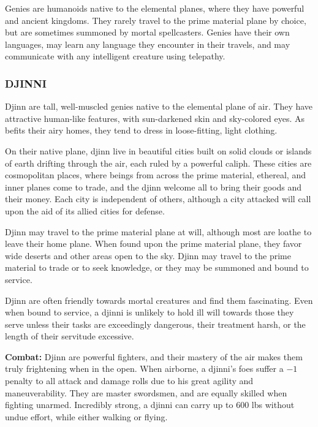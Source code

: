 \begin{multicols}{2}
\begin{minipage}{\columnwidth}
\end{minipage}

Genies are humanoids native to the elemental planes, where they have powerful and ancient kingdoms. They rarely travel to the prime material plane by choice, but are sometimes summoned by mortal spellcasters. Genies have their own languages, may learn any language they encounter in their travels, and may communicate with any intelligent creature using telepathy.

\subsubsection{DJINNI}

Djinn are tall, well-muscled genies native to the elemental plane of air. They have attractive human-like features, with sun-darkened skin and sky-colored eyes. As befits their airy homes, they tend to dress in loose-fitting, light clothing.

On their native plane, djinn live in beautiful cities built on solid clouds or islands of earth drifting through the air, each ruled by a powerful caliph. These cities are cosmopolitan places, where beings from across the prime material, ethereal, and inner planes come to trade, and the djinn welcome all to bring their goods and their money. Each city is independent of others, although a city attacked will call upon the aid of its allied cities  for defense. 

Djinn may travel to the prime material plane at will, although most are loathe to leave their home plane. When found upon the prime material plane, they favor wide deserts and other areas open to the sky. Djinn may travel to the prime material to trade or to seek knowledge, or they may be summoned and bound to service.

Djinn are often friendly towards mortal creatures and find them fascinating. Even when bound to service, a djinni is unlikely to hold ill will towards those they serve unless their tasks are exceedingly dangerous, their treatment harsh, or the length of their servitude excessive.

\textbf{Combat:} Djinn are powerful fighters, and their mastery of the air makes them truly frightening when in the open. When airborne, a djinni's foes suffer a $-1$ penalty to all attack and damage rolls due to his great agility and maneuverability. They are master swordsmen, and are equally skilled when fighting unarmed. Incredibly strong, a djinni can carry up to 600 lbs without undue effort, while either walking or flying.


\end{multicols}
